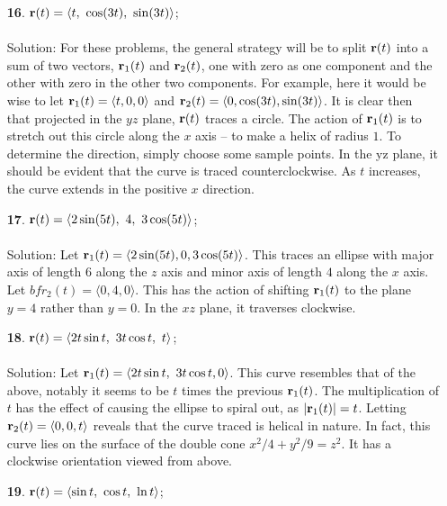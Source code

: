 \documentclass[12pt]{amsbook}
\newcommand{\la}{\langle}
\newcommand{\ra}{\rangle}
\begin{document}
\begin{enumerate}
  \item[{\small\bf 16}.] ${\bf r}(t) = \la t, \ \cos(3t), \ \sin(3t) \ra$;
  \\
  \\
  {\sc Solution}: For these problems, the general strategy will be to split ${\bf r}(t)$ into a sum of two vectors, ${\bf r}_1(t)$ and ${\bf r}_2(t)$, one with zero as one component and the other with zero in the other two components. For example, here it would be wise to let ${\bf r}_1(t)=\la t,0,0 \ra$ and ${\bf r}_2(t)=\la 0,\cos(3t), \sin(3t)\ra$. It is clear then that projected in the $yz$ plane, ${\bf r}(t)$ traces a circle. The action of ${\bf r}_1(t)$ is to stretch out this circle along the $x$ axis -- to make a helix of radius $1$. To determine the direction, simply choose some sample points. In the yz plane, it should be evident that the curve is traced counterclockwise. As $t$ increases, the curve extends in the positive $x$ direction.
  \\
  \item[{\small\bf 17}.] ${\bf r}(t) = \la 2\sin(5t), \ 4, \ 3\cos(5t) \ra$;
  \\
  \\
  {\sc Solution}: Let ${\bf r}_1(t)=\la 2\sin(5t), 0, 3\cos(5t)\ra$. This traces an ellipse with major axis of length $6$ along the $z$ axis and minor axis of length $4$ along the $x$ axis. Let ${bf r}_2(t)=\la 0,4,0\ra$. This has the action of shifting ${\bf r}_1(t)$ to the plane $y=4$ rather than $y=0$. In the $xz$ plane, it traverses clockwise. 
  \\
  \item[{\small\bf 18}.] ${\bf r}(t) = \la 2t\sin t, \ 3t\cos t , \ t \ra$;
  \\
  \\
  {\sc Solution}: Let ${\bf r}_1(t)=\la 2t\sin t, \ 3t\cos t , 0\ra$. This curve resembles that of the above, notably it seems to be $t$ times the previous ${\bf r}_1(t)$. The multiplication of $t$ has the effect of causing the ellipse to spiral out, as $|{\bf r}_1(t)|=t$. Letting ${\bf r}_2(t)=\la 0,0,t\ra$ reveals that the curve traced is helical in nature. In fact, this curve lies on the surface of the double cone $x^2/4+y^2/9=z^2$. It has a clockwise orientation viewed from above. 
  \\
  \item[{\small\bf 19}.] ${\bf r}(t) = \la \sin t, \ \cos t , \ \ln t \ra$;
  \\
  \\

\end{enumerate}
\end{document}
